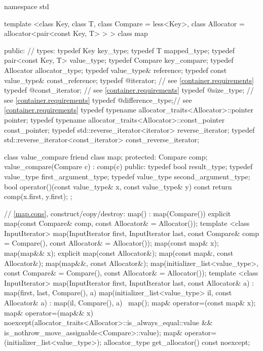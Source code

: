 \begin{codeblock}
namespace std {
  template <class Key, class T, class Compare = less<Key>,
            class Allocator = allocator<pair<const Key, T> > >
  class map {
  public:
    // types:
    typedef Key                                   key_type;
    typedef T                                     mapped_type;
    typedef pair<const Key, T>                    value_type;
    typedef Compare                               key_compare;
    typedef Allocator                             allocator_type;
    typedef value_type&                           reference;
    typedef const value_type&                     const_reference;
    typedef @\impdef@                iterator;       // see \ref{container.requirements}
    typedef @\impdef@                const_iterator; // see \ref{container.requirements}
    typedef @\impdef@                size_type;      // see \ref{container.requirements}
    typedef @\impdef@                difference_type;// see \ref{container.requirements}
    typedef typename allocator_traits<Allocator>::pointer           pointer;
    typedef typename allocator_traits<Allocator>::const_pointer     const_pointer;
    typedef std::reverse_iterator<iterator>       reverse_iterator;
    typedef std::reverse_iterator<const_iterator> const_reverse_iterator;

    class value_compare {
    friend class map;
    protected:
      Compare comp;
      value_compare(Compare c) : comp(c) {}
    public:
      typedef bool result_type;
      typedef value_type first_argument_type;
      typedef value_type second_argument_type;
      bool operator()(const value_type& x, const value_type& y) const {
        return comp(x.first, y.first);
      }
    };

    // \ref{map.cons}, construct/copy/destroy:
    map() : map(Compare()) { }
    explicit map(const Compare& comp, const Allocator& = Allocator());
    template <class InputIterator>
      map(InputIterator first, InputIterator last,
          const Compare& comp = Compare(), const Allocator& = Allocator());
    map(const map& x);
    map(map&& x);
    explicit map(const Allocator&);
    map(const map&, const Allocator&);
    map(map&&, const Allocator&);
    map(initializer_list<value_type>,
      const Compare& = Compare(),
      const Allocator& = Allocator());
    template <class InputIterator>
      map(InputIterator first, InputIterator last, const Allocator& a)
        : map(first, last, Compare(), a) { }
    map(initializer_list<value_type> il, const Allocator& a)
      : map(il, Compare(), a) { }
   ~map();
    map& operator=(const map& x);
    map& operator=(map&& x)
      noexcept(allocator_traits<Allocator>::is_always_equal::value &&
               is_nothrow_move_assignable<Compare>::value);
    map& operator=(initializer_list<value_type>);
    allocator_type get_allocator() const noexcept;

}}
\end{codeblock}
